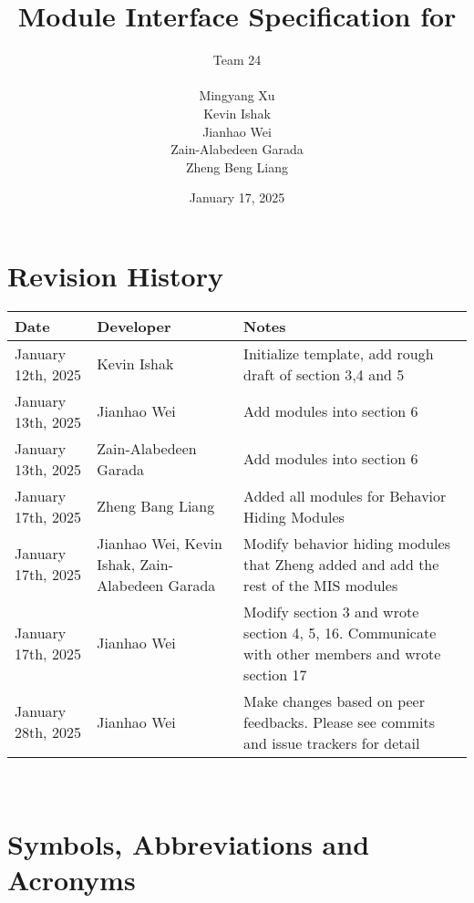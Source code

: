 \documentclass[12pt, titlepage]{article}
\begin{document}
\title{Module Interface Specification for }

\author{\authname Team 24 \\ \\ Mingyang Xu \\ Kevin Ishak \\ Jianhao Wei \\ Zain-Alabedeen Garada \\ Zheng Beng Liang}

\date{January 17, 2025}

\maketitle


\section{Revision History}

\begin{tabularx}{\textwidth}{p{4cm}p{3cm}X}
\toprule {\bf Date} & {\bf Developer} & {\bf Notes}\\
\midrule
January 12th, 2025 & Kevin Ishak & Initialize template, add rough draft of section 3,4 and 5\\
January 13th, 2025 & Jianhao Wei & Add modules into section 6\\
January 13th, 2025 & Zain-Alabedeen Garada & Add modules into section 6\\
January 17th, 2025 & Zheng Bang Liang & Added all modules for Behavior Hiding Modules\\
January 17th, 2025 & Jianhao Wei, Kevin Ishak, Zain-Alabedeen Garada & Modify behavior hiding modules that Zheng added and add the rest of the MIS modules \\
January 17th, 2025 & Jianhao Wei & Modify section 3 and wrote section 4, 5, 16. Communicate with other members and wrote section 17\\
January 28th, 2025 & Jianhao Wei & Make changes based on peer feedbacks. Please see commits and issue trackers for detail\\
\bottomrule
\end{tabularx}

~\newpage

\section{Symbols, Abbreviations and Acronyms}
\end{document}
